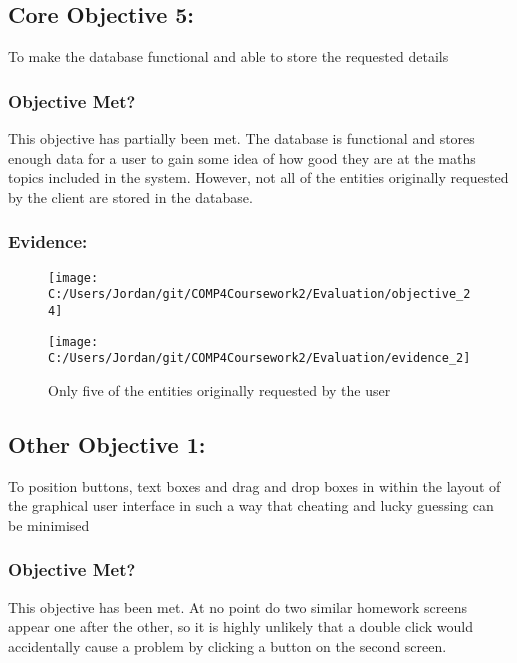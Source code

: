 \subsection{Core Objective 5: }

To make the database functional and able to store the requested details

\subsubsection{Objective Met?}

This objective has partially been met. The database is functional and stores enough data for a user to gain some idea of how good they are at the maths topics included in the system. However, not all of the entities originally requested by the client are stored in the database.

\subsubsection{Evidence: }

\begin{figure}[H]
	\texttt{[image: C:/Users/Jordan/git/COMP4Coursework2/Evaluation/objective\_24]}
\end{figure}

\begin{figure}[H]
	\texttt{[image: C:/Users/Jordan/git/COMP4Coursework2/Evaluation/evidence\_2]}
	\caption{Only five of the entities originally requested by the user}
\end{figure}

\subsection{Other Objective 1: }

To position buttons, text boxes and drag and drop boxes in within the layout of the graphical user interface in such a way that cheating and lucky guessing can be minimised

\subsubsection{Objective Met?}

This objective has been met. At no point do two similar homework screens appear one after the other, so it is highly unlikely that a double click would accidentally cause a problem by clicking a button on the second screen.

